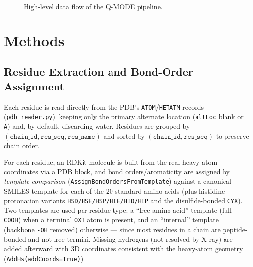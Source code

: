 \documentclass[11pt,a4paper]{article}
\begin{document}
\begin{figure}[h]
    \centering
    \caption{High-level data flow of the Q-MODE pipeline.}
    \label{fig:pipeline-flow}
\end{figure}

\section{Methods}

\subsection{Residue Extraction and Bond-Order Assignment}
\label{sec:residue-extraction}

Each residue is read directly from the PDB's \texttt{ATOM}/\texttt{HETATM} records (\texttt{pdb\_reader.py}), keeping only the primary alternate location (\texttt{altLoc} blank or \texttt{A}) and, by default, discarding water. Residues are grouped by $(\texttt{chain\_id}, \texttt{res\_seq}, \texttt{res\_name})$ and sorted by $(\texttt{chain\_id}, \texttt{res\_seq})$ to preserve chain order.

For each residue, an RDKit molecule is built from the real heavy-atom coordinates via a PDB block, and bond orders/aromaticity are assigned by \emph{template comparison} (\texttt{AssignBondOrdersFromTemplate}) against a canonical SMILES template for each of the 20 standard amino acids (plus histidine protonation variants \texttt{HSD/HSE/HSP/HIE/HID/HIP} and the disulfide-bonded \texttt{CYX}). Two templates are used per residue type: a ``free amino acid'' template (full \texttt{-COOH}) when a terminal \texttt{OXT} atom is present, and an ``internal'' template (backbone \texttt{-OH} removed) otherwise — since most residues in a chain are peptide-bonded and not free termini. Missing hydrogens (not resolved by X-ray) are added afterward with 3D coordinates consistent with the heavy-atom geometry (\texttt{AddHs(addCoords=True)}).
\end{document}
